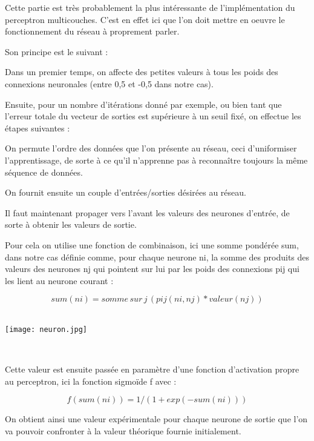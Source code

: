 Cette partie est tr\`es probablement la plus int\'eressante de
l'impl\'ementation du perceptron multicouches. C'est en effet ici que
l'on doit mettre en oeuvre le fonctionnement du r\'eseau \`a proprement
parler. 

Son principe est le suivant :

Dans un premier temps, on affecte des petites valeurs \`a tous les poids
des connexions neuronales (entre 0,5 et -0,5 dans notre cas).

Ensuite, pour un nombre d'it\'erations donn\'e par exemple, ou bien tant
que l'erreur totale du vecteur de sorties est supérieure à un seuil fixé, on effectue
les \'etapes suivantes :

On permute l'ordre des donn\'ees que l'on pr\'esente au r\'eseau, ceci
d'uniformiser l'apprentissage, de sorte \`a ce qu'il n'apprenne pas \`a reconna\^itre toujours la m\^eme
s\'equence de donn\'ees.

On fournit ensuite un couple d'entr\'ees/sorties d\'esir\'ees au
r\'eseau.

Il faut maintenant propager vers l'avant les valeurs des neurones
d'entr\'ee, de sorte \`a obtenir les valeurs de sortie.

Pour cela on utilise une fonction de combinaison, ici une somme
pond\'er\'ee sum, dans notre cas
d\'efinie comme, pour chaque neurone ni, la somme des produits des valeurs
des neurones nj qui pointent sur lui par les poids des connexions pij qui les
lient au neurone courant :

\[sum(ni) = somme\, sur\, j\, (pij(ni,nj)* valeur(nj))
\]%
\\

\begin{center}
	
	\texttt{[image: neuron.jpg]}\\
	\caption{\emph{Calcul de la sortie d'un neurone}}\\
\end{center}




Cette valeur est ensuite pass\'ee en param\`etre d'une fonction
d'activation propre au perceptron, ici la fonction sigmo\"ide f avec :  

\[f(sum(ni)) = 1/(1+exp(-sum(ni))) 
\]%

On obtient ainsi une valeur exp\'erimentale pour chaque neurone de
sortie que l'on va pouvoir confronter \`a la valeur th\'eorique fournie
initialement.

